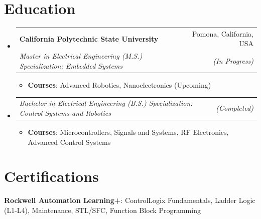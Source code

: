 \documentclass[a4paper,20pt]{article}
\makeatletter
\newcommand{\resumeItem}[2]{
  \item\small{
    \textbf{#1}{: #2 \vspace{-2pt}}
  }
}
\newcommand{\resumeSubheading}[4]{
  \vspace{-1pt}\item[]
    \begin{tabular*}{0.97\textwidth}{l@{\extracolsep{\fill}}r}
      \textbf{#1} & #2 \\
      \textit{#3} & \textit{#4} \\
    \end{tabular*}\vspace{-5pt}
}
\newcommand{\resumeRoleSubheading}[2]{
  \vspace{-1pt}\item[]
    \begin{tabular*}{0.97\textwidth}{l@{\extracolsep{\fill}}r}
      \textit{#1} & \textit{#2} \\
    \end{tabular*}\vspace{-5pt}
}
\newcommand{\resumeSubHeadingListStart}{\begin{itemize}[leftmargin=*]}
\newcommand{\resumeSubHeadingListEnd}{\end{itemize}}
\newcommand{\resumeItemListStart}{\begin{itemize}}
\newcommand{\resumeItemListEnd}{\end{itemize}\vspace{-4pt}}
\makeatother
\begin{document}
\vspace{-4pt}
\section{Education}
  \resumeSubHeadingListStart
    \resumeSubheading
      {California Polytechnic State University}{Pomona, California, USA}
      {Master in Electrical Engineering (M.S.)  Specialization: Embedded Systems}{(In Progress)}
    \vspace{-8pt}
    \resumeItemListStart
      \resumeItem{Courses}{Advanced Robotics, Nanoelectronics (Upcoming)}
    \resumeItemListEnd
    \vspace{-2pt}
    \resumeRoleSubheading
      {Bachelor in Electrical Engineering (B.S.)  Specialization: Control Systems and Robotics}{(Completed)}
    \resumeItemListStart
      \resumeItem{Courses}{Microcontrollers, Signals and Systems, RF Electronics, Advanced Control Systems}
    \resumeItemListEnd
    \resumeSubHeadingListEnd
    \vspace{-8pt}


\vspace{-2pt}
\section{Certifications}
\textbf{Rockwell Automation Learning+}: ControlLogix Fundamentals, Ladder Logic (L1-L4), Maintenance, STL/SFC, Function Block Programming
\end{document}
